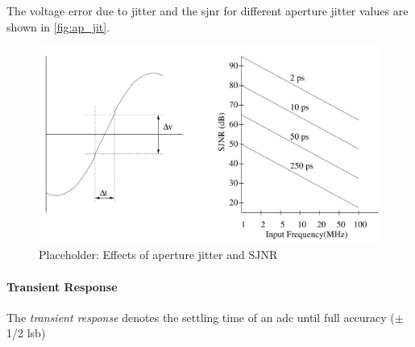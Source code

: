 The voltage error due to jitter and the \gls{sjnr} for different aperture jitter values are shown in \autoref{fig:ap_jit}.

\begin{figure}[tbh]
	\centering
	\includegraphics[width = \textwidth]{chap/02-theory/img/ap_jit}
	\caption{Placeholder: Effects of aperture jitter and SJNR \cite{Lundberg}}
	\label{fig:ap_jit}
\end{figure}

\paragraph{Transient Response}
The \textit{transient response} denotes the settling time of an \gls{adc} until full accuracy ($\pm$ 1/2 \gls{lsb})



